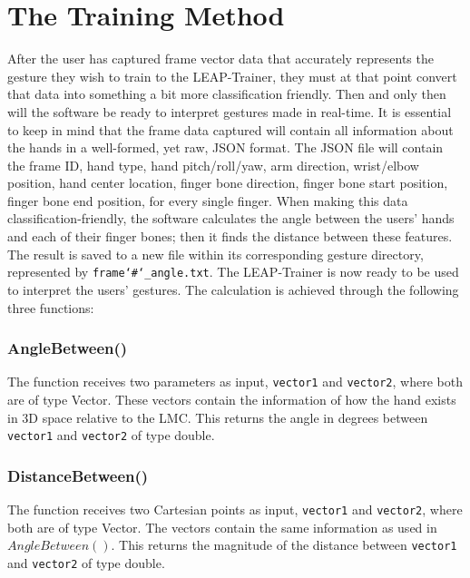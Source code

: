 \documentclass[letterpaper, 10 pt, conference]{ieeeconf}
\begin{document}

\section{The Training Method}

After the user has captured frame vector data that accurately represents the gesture they wish to train to the LEAP-Trainer, they must at that point convert that data into something a bit more classification friendly. Then and only then will the software be ready to interpret gestures made in real-time. It is essential to keep in mind that the frame data captured will contain all information about the hands in a well-formed, yet raw, JSON format. The JSON file will contain the frame ID, hand type, hand pitch/roll/yaw, arm direction, wrist/elbow position, hand center location, finger bone direction, finger bone start position, finger bone end position, for every single finger. When making this data classification-friendly, the software calculates the angle between the users' hands and each of their finger bones; then it finds the distance between these features. The result is saved to a new file within its corresponding gesture directory, represented by \texttt{frame\char`\#\char`_angle.txt}. The LEAP-Trainer is now ready to be used to interpret the users' gestures. The calculation is achieved through the following three functions: 

\vspace{5pt}
\subsubsection{AngleBetween()}
The function receives two parameters as input, \texttt{vector1} and \texttt{vector2}, where both are of type Vector. These vectors contain the information of how the hand exists in 3D space relative to the LMC. This returns the angle in degrees between \texttt{vector1} and \texttt{vector2} of type double.

\vspace{5pt}
\subsubsection{DistanceBetween()}
The function receives two Cartesian points as input, \texttt{vector1} and \texttt{vector2}, where both are of type Vector. The vectors contain the same information as used in $AngleBetween()$. This returns the magnitude of the distance between \texttt{vector1} and \texttt{vector2} of type double.
\end{document}
